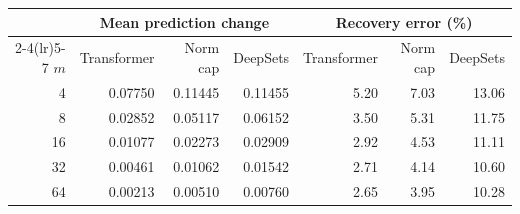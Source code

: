 \begin{tabular}{r rrr rrr}
\toprule
&\multicolumn{3}{c}{Mean prediction change}&\multicolumn{3}{c}{Recovery error (\%)}\\
\cmidrule(lr){2-4}\cmidrule(lr){5-7}
$m$&Transformer&Norm cap&DeepSets&Transformer&Norm cap&DeepSets\\
\midrule
4 & 0.07750 & 0.11445 & 0.11455 & 5.20 & 7.03 & 13.06 \\
8 & 0.02852 & 0.05117 & 0.06152 & 3.50 & 5.31 & 11.75 \\
16 & 0.01077 & 0.02273 & 0.02909 & 2.92 & 4.53 & 11.11 \\
32 & 0.00461 & 0.01062 & 0.01542 & 2.71 & 4.14 & 10.60 \\
64 & 0.00213 & 0.00510 & 0.00760 & 2.65 & 3.95 & 10.28 \\
\bottomrule\end{tabular}

